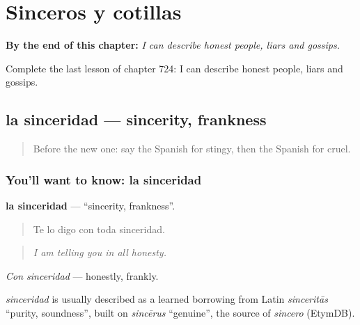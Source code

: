 
\chapter{Sinceros y cotillas}
\label{ch:es-sinceros-y-cotillas}

\begin{chapteropening}
\textbf{By the end of this chapter:} \emph{I can describe honest people, liars and gossips.}

Complete the last lesson of chapter 724: I can describe honest people, liars and gossips.
\end{chapteropening}

\section[la sinceridad]{la sinceridad — sincerity, frankness}

\label{lesson:ES-C724-sinceridad}



\begin{quote}
Before the new one: say the Spanish for stingy, then the Spanish for cruel.
\end{quote}

\subsection*{You'll want to know: la sinceridad}
\textbf{la sinceridad} — \textquotedblleft{}sincerity, frankness\textquotedblright{}.

\begin{quote}
Te lo digo con toda sinceridad.
\end{quote}

\begin{quote}
\emph{I am telling you in all honesty.}
\end{quote}

\emph{Con sinceridad} — honestly, frankly.

\begin{cousinweb}
\emph{sinceridad} is usually described as a learned borrowing from Latin \emph{sinceritās} \textquotedblleft{}purity, soundness\textquotedblright{}, built on \emph{sincērus} \textquotedblleft{}genuine\textquotedblright{}, the source of \emph{sincero} (EtymDB).
\end{cousinweb}

